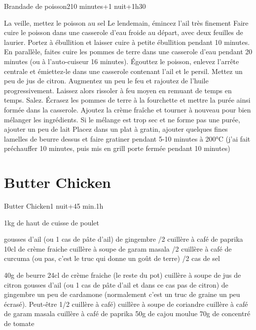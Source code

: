 {\begin{recette}{Brandade de poisson}{2}{10 minutes+1 nuit+1h30}{}
\begin{preparation}
\etape La veille, mettez le poisson au sel
\etape Le lendemain, émincez l'ail très finement 
\etape Faire cuire le poisson dans une casserole d'eau froide au départ, avec deux feuilles de laurier. Portez à ébullition et 
laisser 
cuire à petite ébullition pendant 10 minutes.
\etape En parallèle, faites cuire les pommes de terre dans une casserole d'eau pendant 20 minutes (ou à l'auto-cuiseur 16 
minutes).
\etape Égouttez le poisson, enlevez l'arrête centrale et émiettez-le dans une casserole contenant l'ail et le persil. Mettez un 
peu de jus de citron. Augmentez un peu le feu et rajoutez de l'huile progressivement. Laissez alors rissoler à feu moyen en 
remuant de temps en temps. Salez.
\etape Écrasez les pommes de terre à la fourchette et mettre la purée ainsi formée dans la casserole.
\etape Ajoutez la crème fraîche et tourner à nouveau pour bien mélanger les ingrédients. Si le mélange est trop sec et ne forme 
pas une purée, ajouter un peu de lait
\etape Placez dans un plat à gratin, ajouter quelques fines lamelles de beurre dessus et faire gratiner pendant 5-10 minutes à 
200°C (j'ai fait préchauffer 10 minutes, puis mis en grill porte fermée pendant 10 minutes)
\end{preparation}
\end{recette}

\section{Butter Chicken}
\begin{recette}{Butter Chicken}{}{1 nuit+45 min.}{1h}
\begin{ingredients}
\ingredient 1kg de haut de cuisse de poulet

 gousses d'ail (ou 1 cas de pâte d'ail)
\ingredient 2cm de gingembre
/2 cuillère à café de paprika
\ingredient 10cl de crème fraiche
 cuillère à soupe de garam masala
/2 cuillère à café de curcuma (ou pas, c'est le truc qui donne un goût de terre)
/2 cas de sel

\ingredient 40g de beurre
\ingredient 24cl de crème fraiche (le reste du pot)
 cuillère à soupe de jus de citron
 gousses d'ail (ou 1 cas de pâte d'ail et dans ce cas pas de citron)
\ingredient 2cm de gingembre
\ingredient un peu de cardamone (normalement c'est un truc de graine un peu écrasé). Peut-être 1/2 cuillère à café)
 cuillère à soupe de coriandre
 cuillère à café de garam masala
 cuillère à café de paprika
\ingredient 50g de cajou moulue
\ingredient 70g de concentré de tomate
\end{ingredients}


\end{recette}}
